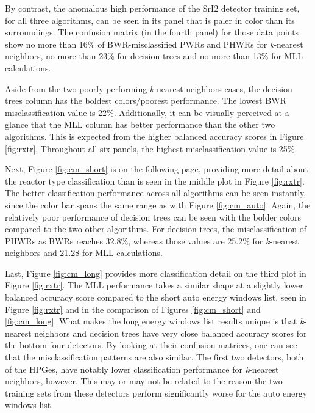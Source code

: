By contrast, the anomalous high performance of the \gls{SrI2} detector training
set, for all three algorithms, can be seen in its panel that is paler in color
than its surroundings.  The confusion matrix (in the fourth panel) for those
data points show no more than 16\% of \gls{BWR}-misclassified \gls{PWR}s and
\gls{PHWR}s for \textit{k}-nearest neighbors, no more than 23\% for decision
trees and no more than 13\% for \gls{MLL} calculations. 

Aside from the two poorly performing \textit{k}-nearest neighbors cases, the
decision trees column has the boldest colors/poorest performance.  The lowest
\gls{BWR} misclassification value is 22\%.  Additionally, it can be visually
perceived at a glance that the \gls{MLL} column has better performance than the
other two algorithms. This is expected from the higher balanced accuracy scores
in Figure \ref{fig:rxtr}.  Throughout all six panels, the highest
misclassification value is 25\%.

Next, Figure \ref{fig:cm_short} is on the following page, providing more detail
about the reactor type classification than is seen in the middle plot in Figure
\ref{fig:rxtr}.  The better classification performance across all algorithms
can be seen instantly, since the color bar spans the same range as with Figure
\ref{fig:cm_auto}. Again, the relatively poor performance of decision trees can
be seen with the bolder colors compared to the two other algorithms. For
decision trees, the misclassification of \gls{PHWR}s as \gls{BWR}s reaches
32.8\%, whereas those values are 25.2\% for \textit{k}-nearest neighbors and
21.2\$ for \gls{MLL} calculations.

Last, Figure \ref{fig:cm_long} provides more classification detail on the third
plot in Figure \ref{fig:rxtr}. The \gls{MLL} performance takes a similar shape
at a slightly lower balanced accuracy score compared to the short auto energy
windows list, seen in Figure \ref{fig:rxtr} and in the comparison of Figures
\ref{fig:cm_short} and \ref{fig:cm_long}. What makes the long energy windows
list results unique is that \textit{k}-nearest neighbors and decision trees
have very close balanced accuracy scores for the bottom four detectors. By
looking at their confusion matrices, one can see that the misclassification
patterns are also similar. The first two detectors, both of the \gls{HPGe}s,
have notably lower classification performance for \textit{k}-nearest neighbors,
however. This may or may not be related to the reason the two training sets
from these detectors perform significantly worse for the auto energy windows
list. 

